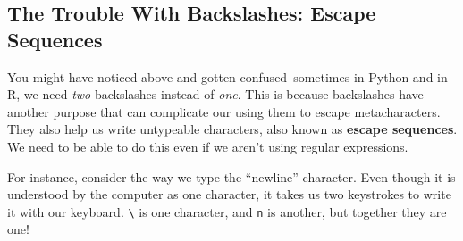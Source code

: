 \documentclass[12pt,krantz2]{krantz}
\makeatletter
\newenvironment{Shaded}{\begin{snugshade}}{\end{snugshade}}
\newcommand{\BuiltInTok}[1]{#1}
\newcommand{\CharTok}[1]{\textcolor[rgb]{0.5,0.5,0.5}{#1}}
\newcommand{\CommentTok}[1]{\textcolor[rgb]{0.37,0.37,0.37}{\textit{#1}}}
\newcommand{\DataTypeTok}[1]{\textcolor[rgb]{0.27,0.27,0.27}{#1}}
\newcommand{\KeywordTok}[1]{\textcolor[rgb]{0.27,0.27,0.27}{\textbf{#1}}}
\newcommand{\NormalTok}[1]{#1}
\newcommand{\OperatorTok}[1]{\textcolor[rgb]{0.43,0.43,0.43}{\textbf{#1}}}
\newcommand{\OtherTok}[1]{\textcolor[rgb]{0.37,0.37,0.37}{#1}}
\newcommand{\StringTok}[1]{\textcolor[rgb]{0.5,0.5,0.5}{#1}}
\newcommand{\VariableTok}[1]{\textcolor[rgb]{0,0,0}{#1}}
\newenvironment{kframe}{%
\medskip{}
\setlength{\fboxsep}{.8em}
 \def\at@end@of@kframe{}%
 \ifinner\ifhmode%
  \def\at@end@of@kframe{\end{minipage}}%
  \begin{minipage}{\columnwidth}%
 \fi\fi%
 \def\FrameCommand##1{\hskip\@totalleftmargin \hskip-\fboxsep
 \colorbox{shadecolor}{##1}\hskip-\fboxsep
     \hskip-\linewidth \hskip-\@totalleftmargin \hskip\columnwidth}%
 \MakeFramed {\advance\hsize-\width
   \@totalleftmargin\z@ \linewidth\hsize
   \@setminipage}}%
 {\par\unskip\endMakeFramed%
 \at@end@of@kframe}
\renewenvironment{Shaded}{\begin{kframe}}{\end{kframe}}
\makeatother
\begin{document}
\begin{Shaded}
\end{Shaded}

\begin{Shaded}
\end{Shaded}

\hypertarget{the-trouble-with-backslashes-escape-sequences}{%
\subsection{The Trouble With Backslashes: Escape Sequences}\label{the-trouble-with-backslashes-escape-sequences}}

You might have noticed above and gotten confused--sometimes in Python and in R, we need \emph{two} backslashes instead of \emph{one}. This is because backslashes have another purpose that can complicate our using them to escape metacharacters. They also help us write untypeable characters, also known as \textbf{escape sequences}. We need to be able to do this even if we aren't using regular expressions.

For instance, consider the way we type the ``newline'' character. Even though it is understood by the computer as one character, it takes us two keystrokes to write it with our keyboard. \texttt{\textbackslash{}} is one character, and \texttt{n} is another, but together they are one!
\end{document}
